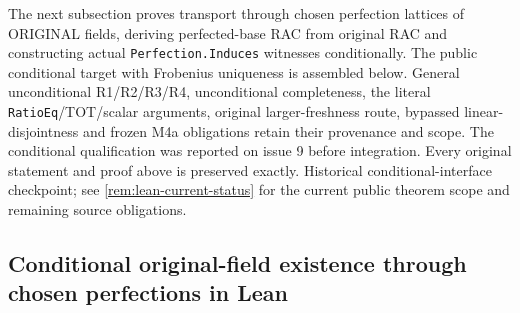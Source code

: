 \documentclass[11pt,oneside]{article}
\theoremstyle{definition}
\theoremstyle{remark}
\newcommand{\lean}[1]{\nolinkurl{#1}}
\begin{document}
The next subsection proves transport through chosen perfection lattices of
ORIGINAL fields, deriving perfected-base RAC from original RAC and constructing
actual \lean{Perfection.Induces} witnesses conditionally. The public conditional target with Frobenius uniqueness is assembled below. General unconditional R1/R2/R3/R4,
unconditional completeness, the literal \lean{RatioEq}/TOT/scalar arguments,
original larger-freshness route, bypassed linear-disjointness and frozen M4a
obligations retain their provenance and scope. The conditional qualification
was reported on issue 9 before integration. Every original statement and proof
above is preserved exactly.
Historical conditional-interface checkpoint; see \cref{rem:lean-current-status} for
the current public theorem scope and remaining source obligations.

\subsection{Conditional original-field existence through chosen perfections in Lean}
\end{document}
